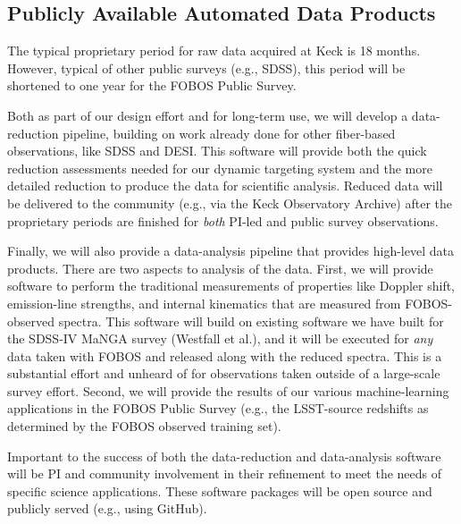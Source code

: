 \documentclass[oneside,11pt]{amsart}
\newcommand{\comment}[2][todo]{{\color{#1}[[{\bf #2}]]}}
\begin{document}
\subsection{Publicly Available Automated Data Products}
\label{sec:DAP}

The typical proprietary period for raw data acquired at Keck is 18
months.  However, typical of other public surveys (e.g., SDSS), this
period will be shortened to one year for the FOBOS Public Survey.

Both as part of our design effort and for long-term use, we will develop
a data-reduction pipeline, building on work already done for other
fiber-based observations, like SDSS and DESI.  This software will
provide both the quick reduction assessments needed for our dynamic
targeting system and the more detailed reduction to produce the data for
scientific analysis.  Reduced data will be delivered to the community
(e.g., via the Keck Observatory Archive) after the proprietary periods
are finished for {\it both} PI-led and public survey observations.

Finally, we will also provide a data-analysis pipeline that provides
high-level data products.  There are two aspects to analysis of the
data.  First, we will provide software to perform the traditional
measurements of properties like Doppler shift, emission-line strengths,
and internal kinematics that are measured from FOBOS-observed spectra.
This software will build on existing software we have built for the
SDSS-IV MaNGA survey (Westfall et al.), and it will be executed for {\it
any} data taken with FOBOS and released along with the reduced spectra.
This is a substantial effort and unheard of for observations taken
outside of a large-scale survey effort.  Second, we will provide the
results of our various machine-learning applications in the FOBOS Public
Survey (e.g., the LSST-source redshifts as determined by the FOBOS
observed training set).

Important to the success of both the data-reduction and data-analysis
software will be PI and community involvement in their refinement to
meet the needs of specific science applications.  These software
packages will be open source and publicly served (e.g., using GitHub).

\end{document}
